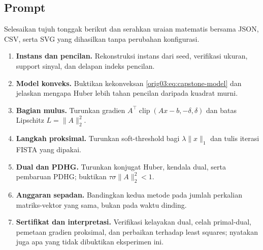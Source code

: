 \subsection*{Prompt}
\begin{exercise}
Selesaikan tujuh tonggak berikut dan serahkan uraian matematis bersama JSON,
CSV, serta SVG yang dihasilkan tanpa perubahan konfigurasi.
\begin{enumerate}
  \item \label{orig03:capstone:milestone:0001}\textbf{Instans dan pencilan.} Rekonstruksi instans dari seed,
    verifikasi ukuran, support sinyal, dan delapan indeks pencilan.
  \item \label{orig03:capstone:milestone:0002}\textbf{Model konveks.} Buktikan kekonveksan \eqref{orig03:eq:capstone-model}
    dan jelaskan mengapa Huber lebih tahan pencilan daripada kuadrat murni.
  \item \label{orig03:capstone:milestone:0003}\textbf{Bagian mulus.} Turunkan gradien
    $A^\top\operatorname{clip}(Ax-b,-\delta,\delta)$ dan batas Lipschitz
    $L=\|A\|_2^2$.
  \item \label{orig03:capstone:milestone:0004}\textbf{Langkah proksimal.} Turunkan soft-threshold bagi
    $\lambda\|x\|_1$ dan tulis iterasi FISTA yang dipakai.
  \item \label{orig03:capstone:milestone:0005}\textbf{Dual dan PDHG.} Turunkan konjugat Huber, kendala dual, serta
    pembaruan PDHG; buktikan $\tau\sigma\|A\|_2^2<1$.
  \item \label{orig03:capstone:milestone:0006}\textbf{Anggaran sepadan.} Bandingkan kedua metode pada jumlah
    perkalian matriks-vektor yang sama, bukan pada waktu dinding.
  \item \label{orig03:capstone:milestone:0007}\textbf{Sertifikat dan interpretasi.} Verifikasi kelayakan dual,
    celah primal-dual, pemetaan gradien proksimal, dan perbaikan terhadap
    least squares; nyatakan juga apa yang tidak dibuktikan eksperimen ini.
\end{enumerate}
\end{exercise}

